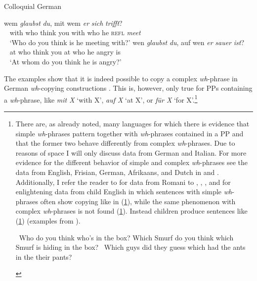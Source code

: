 \begin{exe}
\ex Colloquial German\label{whcopyinggermanb}\begin{xlist}
\ex {} {wem} {\textit{glaubst}} {\textit{du},} {mit} {wem} {\textit{er}} {\textit{sich}} {\textit{trifft}?}   \\
{\textcolor{white}{\%}with} {who} {think} {you} {with} {who} {he} {\textsc{refl}}  {\textit{meet}}\\
\trans \textcolor{white}{\%}`Who do you think is he meeting with?' \label{ex:whcopyinggermanba}
\ex {} {wen} {\textit{glaubst}} {\textit{du},} {auf} {wen} {\textit{er}} {\textit{sauer}} {\textit{ist}?}  \\
{\textcolor{white}{\%}at} {who} {think} {you} {at} {who} {he} {angry} {is} \\
\trans \textcolor{white}{\%}`At whom do you think he is angry?' \label{ex:whcopyinggermanbb}

\end{xlist}
\end{exe}

\largerpage[-3]
\noindent The examples show that it is indeed possible to copy a complex \textit{wh}-phrase in German \textit{wh}-copying constructions \citep{mcdaniel1986conditions, felser2004wh, nunes2004linearization, van2010complex}. This is, however, only true for PPs containing a \textit{wh}-phrase, like \textit{mit X} `with X', \textit{auf X} `at X', or \textit{für X} `for X'.\footnote{There are, as already noted, many languages for which there is evidence that simple \textit{wh}-phrases pattern together with \textit{wh}-phrases contained in a PP and that the former two behave differently from complex \textit{wh}-phrases. Due to reasons of space I will only discuss data from German and Italian. For more evidence for the different behavior of simple and complex \textit{wh}-phrases see the data from English, Frisian, German, Afrikaans, and Dutch in \citet{van2010complex, van2012you} and \citet{felser2004wh}. Additionally, I refer the reader to \citet{mcdaniel1986conditions, mcdaniel1989partial} for data from Romani to \citet{de1990acquisition}, \citet{thornton1990adventures}, \citet{thornton1999levels}, and \citet{mcdaniel1995parameters} for enlightening data from child English in which sentences with simple \textit{wh}-phrases often show copying like in (\ref{childrensenglisha}), while the same phenomenon with complex \textit{wh}-phrases is not found (\ref{childrensenglishb}). Instead children produce sentences like (\ref{childrensenglishc}) (examples from \citealt[7]{thornton1999levels}).

\begin{exe}
\ex\label{childrensenglish}\begin{xlist}
\ex \textcolor{white}{*}Who do you think who's in the box? \label{childrensenglisha}
\ex *Which Smurf do you think which Smurf is hiding in the box? \label{childrensenglishb}
\ex \textcolor{white}{*}Which guys did they guess which had the ants in the their pants? \label{childrensenglishc}
\end{xlist}
\end{exe}



}  


